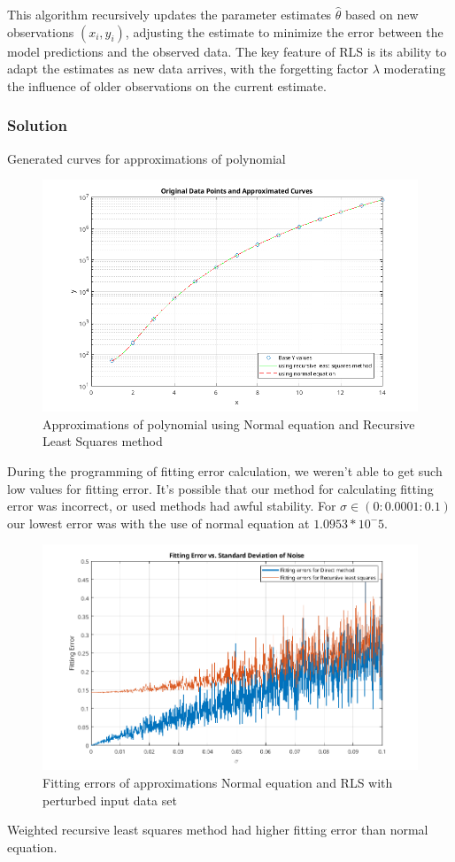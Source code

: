 This algorithm recursively updates the parameter estimates \( \hat{\theta} \) based on new observations \( (x_i, y_i) \), adjusting the estimate to minimize the error between the model predictions and the observed data. The key feature of RLS is its ability to adapt the estimates as new data arrives, with the forgetting factor \( \lambda \) moderating the influence of older observations on the current estimate.

\subsubsection*{Solution}
Generated curves for approximations of polynomial 
\begin{figure}[H]
    \centering
    \includegraphics[width=1\textwidth]{images/Problem_11/ApproxCurves.png}
    \caption{Approximations of polynomial using Normal equation and Recursive Least Squares method}
\end{figure}
During the programming of fitting error calculation, we weren't able to get such low values for fitting error. 
It's possible that our method for calculating fitting error was incorrect, or used methods had awful stability.
For $\sigma \in (0:0.0001:0.1)$ our lowest error was with the use of normal equation at $1.0953*10^-5$.
\begin{figure}[H]
    \centering
    \includegraphics[width=1\textwidth]{images/Problem_11/fittingErrors.png}
    \caption{Fitting errors of approximations Normal equation and RLS with perturbed input data set}
\end{figure}
Weighted recursive least squares method had higher fitting error than normal equation.

